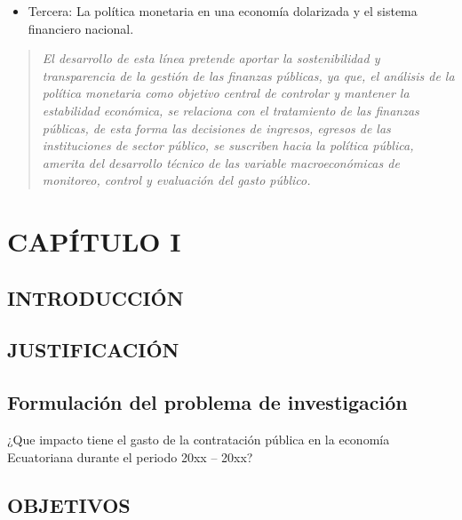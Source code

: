 \documentclass[
  letterpaper,
  DIV=11,
  numbers=noendperiod]{scrreprt}
\providecommand{\tightlist}{%
  \setlength{\itemsep}{0pt}\setlength{\parskip}{0pt}}\usepackage{longtable,booktabs,array}
\begin{document}
\begin{itemize}
\tightlist
\item
  Tercera: La política monetaria en una economía dolarizada y el sistema
  financiero nacional.
\end{itemize}

\begin{quote}
\emph{El desarrollo de esta línea pretende aportar la sostenibilidad y
transparencia de la gestión de las finanzas públicas, ya que, el
análisis de la política monetaria como objetivo central de controlar y
mantener la estabilidad económica, se relaciona con el tratamiento de
las finanzas públicas, de esta forma las decisiones de ingresos, egresos
de las instituciones de sector público, se suscriben hacia la política
pública, amerita del desarrollo técnico de las variable macroeconómicas
de monitoreo, control y evaluación del gasto público.}
\end{quote}


\hypertarget{capuxedtulo-i}{%
\chapter{CAPÍTULO I}\label{capuxedtulo-i}}

\hypertarget{introducciuxf3n}{%
\section{INTRODUCCIÓN}\label{introducciuxf3n}}

\hypertarget{justificaciuxf3n}{%
\section{JUSTIFICACIÓN}\label{justificaciuxf3n}}

\hypertarget{formulaciuxf3n-del-problema-de-investigaciuxf3n}{%
\section{Formulación del problema de
investigación}\label{formulaciuxf3n-del-problema-de-investigaciuxf3n}}

¿Que impacto tiene el gasto de la contratación pública en la economía
Ecuatoriana durante el periodo 20xx -- 20xx?

\hypertarget{objetivos}{%
\section{OBJETIVOS}\label{objetivos}}
\end{document}
